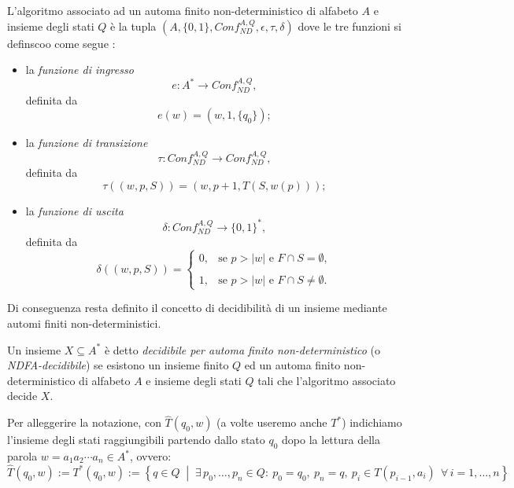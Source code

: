 \begin{defi}
L'algoritmo associato ad un automa finito non-deterministico di alfabeto $A$ e insieme degli stati $Q$ è la tupla $(A,\{0,1\}, Conf_{ND}^{A,Q},\epsilon,\tau,\delta)$  dove le tre funzioni si definscoo come segue :

\begin{itemize}
    \item la \emph{funzione di ingresso}
    \[
    e:A^*\longrightarrow {Conf}^{A,Q}_{ND},
    \]
    definita da
    \[
    e(w)=(w,1,\{q_0\});
    \]

    \item la \emph{funzione di transizione}
    \[
    \tau:{Conf}^{A,Q}_{ND}\longrightarrow
    {Conf}^{A,Q}_{ND},
    \]
    definita da
    \[
    \tau((w,p,S))
    =
    (w,p+1,T(S,w(p)));
    \]

    \item la \emph{funzione di uscita}
    \[
    \delta:{Conf}^{A,Q}_{ND}\longrightarrow\{0,1\}^*,
    \]
    definita da
    \[
    \delta((w,p,S))
    =
    \left\{
    \begin{matrix}
        0, & \text{se } p>|w| \text{ e } F\cap S=\emptyset,\\
        \\
        1,  & \text{se } p>|w| \text{ e } F\cap S\neq\emptyset.
    \end{matrix}
    \right.
    \]
\end{itemize}
\end{defi}

Di conseguenza resta definito il concetto di decidibilità di un insieme mediante automi finiti non-deterministici.


\begin{defi}
Un insieme $X\subseteq A^*$ è detto \emph{decidibile per automa finito non-deterministico} (o \emph{NDFA-decidibile}) se esistono un insieme finito $Q$ ed un automa finito non-deterministico di alfabeto $A$ e insieme degli stati $Q$ tali che l'algoritmo associato decide $X$.
\end{defi}

Per alleggerire la notazione, con
$\widehat T(q_0, w)$ (a volte useremo anche $T^*$) indichiamo
l'insieme degli stati raggiungibili partendo dallo stato 
$q_0$ dopo la lettura della parola $w=a_1 a_2 \cdots a_n\in A^*$, ovvero:
\[
\widehat T(q_0, w):=
 T^* (q_0, w):=
 \left\{
 q \in Q \;\middle|\;
 \exists\, p_0, \dots, p_n \in Q :\ 
 p_0 = q_0,\ p_n = q,\ p_i \in T(p_{i-1}, a_i)\ \ \forall\, i = 1, \dots, n
 \right\}
\]

